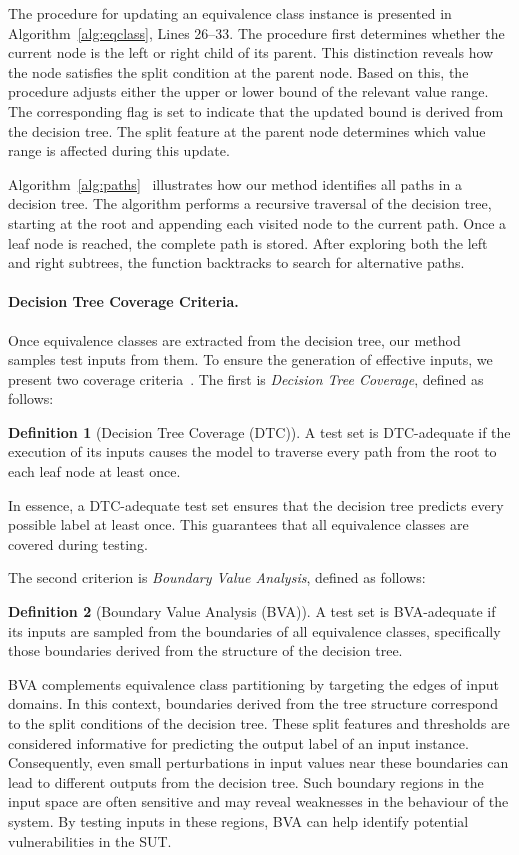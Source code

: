 \documentclass[
]{ceurart}
\theoremstyle{definition}
\newtheorem{definition}{Definition}[section]
\begin{document}
The procedure for updating an equivalence class instance is presented in Algorithm~\ref{alg:eqclass}, Lines 26–33. The procedure first determines whether the current node is the left or right child of its parent. This distinction reveals how the node satisfies the split condition at the parent node. Based on this, the procedure adjusts either the upper or lower bound of the relevant value range. The corresponding flag is set to indicate that the updated bound is derived from the decision tree. The split feature at the parent node determines which value range is affected during this update.

Algorithm~\ref{alg:paths}~\cite{traversal} illustrates how our method identifies all paths in a decision tree. The algorithm performs a recursive traversal of the decision tree, starting at the root and appending each visited node to the current path. Once a leaf node is reached, the complete path is stored. After exploring both the left and right subtrees, the function backtracks to search for alternative paths.

\paragraph{Decision Tree Coverage Criteria.}
Once equivalence classes are extracted from the decision tree, our method samples test inputs from them. To ensure the generation of effective inputs, we present two coverage criteria~\cite{durelli}. The first is \textit{Decision Tree Coverage}, defined as follows:
\begin{definition}[Decision Tree Coverage (DTC)]
\label{def:dtc}
A test set is DTC-adequate if the execution of its inputs causes the model to traverse every path from the root to each leaf node at least once.
\end{definition}
In essence, a DTC-adequate test set ensures that the decision tree predicts every possible label at least once. This guarantees that all equivalence classes are covered during testing.

The second criterion is \textit{Boundary Value Analysis}, defined as follows:
\begin{definition}[Boundary Value Analysis (BVA)]
\label{def:bva}
A test set is BVA-adequate if its inputs are sampled from the boundaries of all equivalence classes, specifically those boundaries derived from the structure of the decision tree.
\end{definition}
BVA complements equivalence class partitioning by targeting the edges of input domains. In this context, boundaries derived from the tree structure correspond to the split conditions of the decision tree. These split features and thresholds are considered informative for predicting the output label of an input instance. Consequently, even small perturbations in input values near these boundaries can lead to different outputs from the decision tree. Such boundary regions in the input space are often sensitive and may reveal weaknesses in the behaviour of the system. By testing inputs in these regions, BVA can help identify potential vulnerabilities in the SUT.
\end{document}
